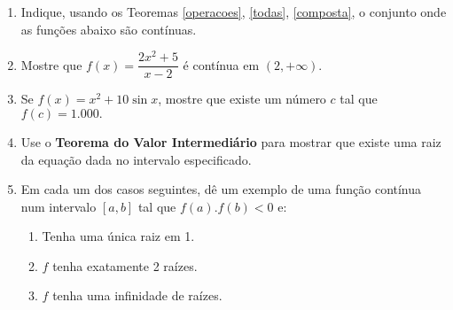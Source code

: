 \begin{enumerate}
                                                                                                                                                                                      
\item Indique, usando os Teoremas \ref{operacoes}, \ref{todas}, \ref{composta}, o conjunto onde as funções abaixo são contínuas.
\begin{enumerate}
\end{enumerate}

\item Mostre que $f(x)=\dfrac{2x^2+5}{x-2}$ é contínua em $(2,+\infty)$. 

\item Se $f(x) =x^2+10\sin{x}$, mostre que existe um número $c$ tal que $f(c)=1.000.$
\item Use o \textbf{Teorema do Valor Intermediário} para mostrar que existe uma raiz da equação dada no intervalo especificado.
\begin{enumerate}
\end{enumerate}

\item Em cada um dos casos seguintes, dê um exemplo de uma função contínua num intervalo $[a, b]$ tal que $f(a).f(b)<0$ e:
   \begin{enumerate}

    \item Tenha uma única raiz em 1.

    \item $f$ tenha exatamente 2 raízes.

    \item $f$ tenha uma infinidade de raízes.
   \end{enumerate}

\end{enumerate}